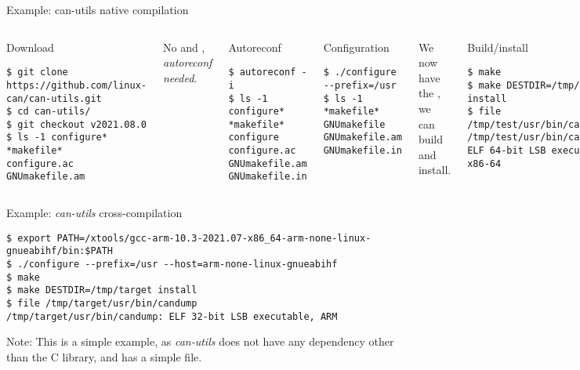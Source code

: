 \begin{frame}[fragile]{Example: can-utils native compilation}
  \begin{columns}
  \begin{block}{Download}
    {\tiny
\begin{verbatim}
$ git clone https://github.com/linux-can/can-utils.git
$ cd can-utils/
$ git checkout v2021.08.0
$ ls -1 configure* *makefile*
configure.ac
GNUmakefile.am
\end{verbatim}
    }
  \end{block}

  {\small No  and
    , {\em autoreconf needed}.}

  \begin{block}{Autoreconf}
    {\tiny
\begin{verbatim}
$ autoreconf -i
$ ls -1 configure* *makefile*
configure
configure.ac
GNUmakefile.am
GNUmakefile.in
\end{verbatim}
    }
  \end{block}


  \begin{block}{Configuration}
    {\tiny
\begin{verbatim}
$ ./configure --prefix=/usr
$ ls -1 *makefile*
GNUmakefile
GNUmakefile.am
GNUmakefile.in
\end{verbatim}
    }
  \end{block}

  {\small We now have the , we can build and install.}

  \begin{block}{Build/install}
    {\tiny
\begin{verbatim}
$ make
$ make DESTDIR=/tmp/test install
$ file /tmp/test/usr/bin/candump
/tmp/test/usr/bin/candump: ELF 64-bit LSB executable, x86-64
\end{verbatim}
    }
  \end{block}

\end{columns}
\end{frame}

\begin{frame}[fragile]{Example: {\em can-utils} cross-compilation}
  \begin{block}{}
    {\scriptsize
\begin{verbatim}
$ export PATH=/xtools/gcc-arm-10.3-2021.07-x86_64-arm-none-linux-gnueabihf/bin:$PATH
$ ./configure --prefix=/usr --host=arm-none-linux-gnueabihf
$ make
$ make DESTDIR=/tmp/target install
$ file /tmp/target/usr/bin/candump
/tmp/target/usr/bin/candump: ELF 32-bit LSB executable, ARM
\end{verbatim}
    }
    \end{block}

    Note: This is a simple example, as {\em can-utils} does not have
    any dependency other than the C library, and has a simple
     file.
\end{frame}

